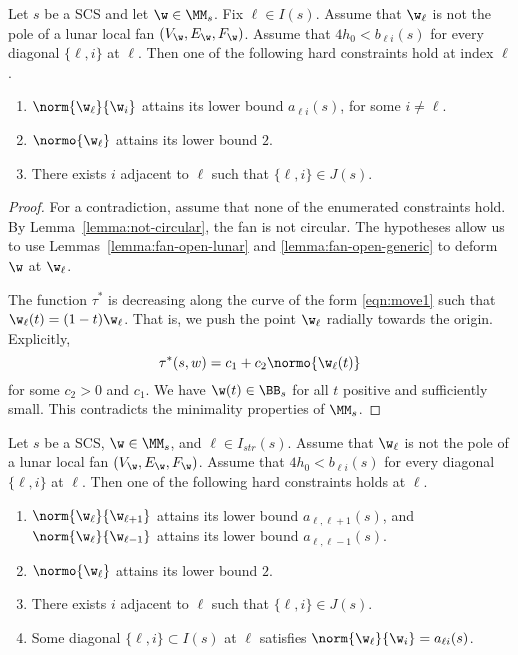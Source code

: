 \begin{lemma}\label{lemma:odx2} 
Let $s$ be a SCS and let $\w\in \MM_s$.  Fix $\ell\in I(s)$.
Assume  that $\w_\ell$ is not the pole of a lunar local fan $(V_\w,E_\w,F_\w)$.
Assume that $4h_0 < b_{\ell i}(s)$ for every diagonal $\{\ell,i\}$ at $\ell$.
Then one of the following hard  constraints hold at index $\ell$.
\begin{enumerate}
\item $\norm{\w_\ell}{\w_i}$ attains its lower bound $a_{\ell i}(s)$, for
  some $i\ne \ell$.
\item $\normo{\w_\ell}$ attains its lower bound $2$.
\item There exists $i$ adjacent to $\ell$ such that $\{\ell,i\}\in J(s)$.
\end{enumerate}
\end{lemma}

\begin{proof} 
For a contradiction, assume that none of the enumerated constraints hold.
By Lemma~\ref{lemma:not-circular}, the fan is not circular.
The hypotheses
allow us to use Lemmas~\ref{lemma:fan-open-lunar} and
\ref{lemma:fan-open-generic} to deform $\w$ at $\w_\ell$.

The function $\tau^*$ is decreasing along
the curve of the form \eqref{eqn:move1} such that
$\w_\ell(t)=(1-t) \w_\ell$.
That is, we push the point $\w_\ell$ radially towards the origin.
Explicitly, 
\[
\tau^*(s,w) = c_1 + c_2 \normo{\w_\ell(t)}
\]
for some $c_2>0$ and $c_1$.
We have
$\w(t)\in \BB_s$ for all $t$ positive and sufficiently
small.  This contradicts the minimality properties of $\MM_s$.
\end{proof}

\begin{lemma}\label{lemma:imj2}
Let $s$ be a SCS, $\w\in \MM_s$, and $\ell\in I_{str}(s)$.  
Assume  that $\w_\ell$ is not the pole of a lunar local fan $(V_\w,E_\w,F_\w)$.
Assume that $4h_0 < b_{\ell i}(s)$ for every diagonal $\{\ell,i\}$ at $\ell$.
Then one of the following hard constraints holds at $\ell$.
\begin{enumerate}
\item $\norm{\w_\ell}{\w_{\ell+1}}$ attains its lower bound $a_{\ell,\ell+1}(s)$, and
 $\norm{\w_\ell}{\w_{\ell-1}}$ attains its lower bound $a_{\ell,\ell-1}(s)$.
\item $\normo{\w_\ell}$ attains its lower bound $2$.
\item There exists $i$ adjacent to $\ell$ such that $\{\ell,i\}\in J(s)$.
\item Some diagonal $\{\ell,i\}\subset I(s)$ at $\ell$ satisfies
$\norm{\w_\ell}{\w_i}=a_{\ell i}(s)$.
\end{enumerate}
\end{lemma}

